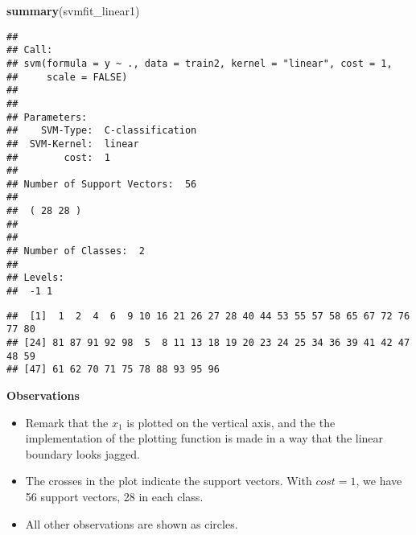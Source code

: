 \documentclass[10pt,ignorenonframetext,]{beamer}
\newenvironment{Shaded}{\begin{snugshade}}{\end{snugshade}}
\newcommand{\KeywordTok}[1]{\textcolor[rgb]{0.13,0.29,0.53}{\textbf{#1}}}
\newcommand{\CommentTok}[1]{\textcolor[rgb]{0.56,0.35,0.01}{\textit{#1}}}
\newcommand{\OperatorTok}[1]{\textcolor[rgb]{0.81,0.36,0.00}{\textbf{#1}}}
\newcommand{\NormalTok}[1]{#1}
\providecommand{\tightlist}{%
  \setlength{\itemsep}{0pt}\setlength{\parskip}{0pt}}
\begin{document}
\begin{frame}[fragile]

\begin{Shaded}
\begin{Highlighting}[]
\KeywordTok{summary}\NormalTok{(svmfit_linear1)}
\end{Highlighting}
\end{Shaded}

\begin{verbatim}
## 
## Call:
## svm(formula = y ~ ., data = train2, kernel = "linear", cost = 1, 
##     scale = FALSE)
## 
## 
## Parameters:
##    SVM-Type:  C-classification 
##  SVM-Kernel:  linear 
##        cost:  1 
## 
## Number of Support Vectors:  56
## 
##  ( 28 28 )
## 
## 
## Number of Classes:  2 
## 
## Levels: 
##  -1 1
\end{verbatim}

\begin{Shaded}
\end{Shaded}

\begin{verbatim}
##  [1]  1  2  4  6  9 10 16 21 26 27 28 40 44 53 55 57 58 65 67 72 76 77 80
## [24] 81 87 91 92 98  5  8 11 13 18 19 20 23 24 25 34 36 39 41 42 47 48 59
## [47] 61 62 70 71 75 78 88 93 95 96
\end{verbatim}

\normalsize

\end{frame}

\begin{frame}

\textbf{Observations}

\begin{itemize}
\tightlist
\item
  Remark that the \(x_1\) is plotted on the vertical axis, and the the
  implementation of the plotting function is made in a way that the
  linear boundary looks jagged.
\item
  The crosses in the plot indicate the support vectors. With \(cost=1\),
  we have 56 support vectors, 28 in each class.
\item
  All other observations are shown as circles.
\end{itemize}

\end{frame}
\end{document}
